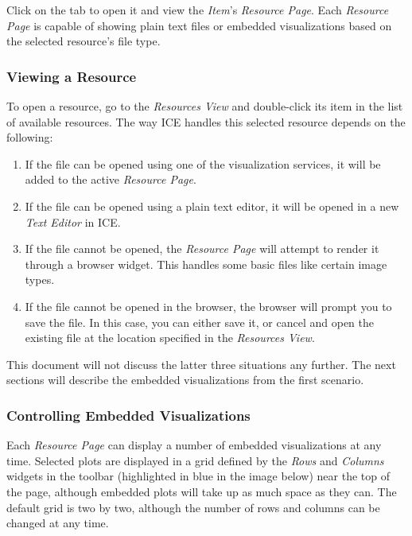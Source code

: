 Click on the tab to open it and view the \emph{Item}'s \emph{Resource
Page}. Each \emph{Resource Page} is capable of showing plain text files
or embedded visualizations based on the selected resource's file type.

\subsubsection{Viewing a Resource}\label{viewing-a-resource}

To open a resource, go to the \emph{Resources View} and double-click its
item in the list of available resources. The way ICE handles this
selected resource depends on the following:

\begin{enumerate}
\itemsep1pt\parskip0pt
\item
  If the file can be opened using one of the visualization services, it
  will be added to the active \emph{Resource Page}.
\item
  If the file can be opened using a plain text editor, it will be opened
  in a new \emph{Text Editor} in ICE.
\item
  If the file cannot be opened, the \emph{Resource Page} will attempt to
  render it through a browser widget. This handles some basic files like
  certain image types.
\item
  If the file cannot be opened in the browser, the browser will prompt
  you to save the file. In this case, you can either save it, or cancel
  and open the existing file at the location specified in the
  \emph{Resources View}.
\end{enumerate}

This document will not discuss the latter three situations any further.
The next sections will describe the embedded visualizations from the
first scenario.

\subsubsection{Controlling Embedded
Visualizations}\label{controlling-embedded-visualizations}

Each \emph{Resource Page} can display a number of embedded
visualizations at any time. Selected plots are displayed in a grid
defined by the \emph{Rows} and \emph{Columns} widgets in the toolbar
(highlighted in blue in the image below) near the top of the page,
although embedded plots will take up as much space as they can. The
default grid is two by two, although the number of rows and columns can
be changed at any time.

